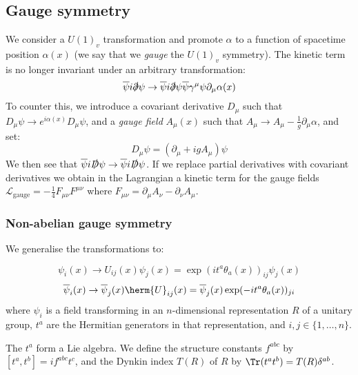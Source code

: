 \documentclass{jknotes}
\begin{document}
\subsection{Gauge symmetry}
We consider a \(U(1)_v\) transformation and promote \(\alpha\) to a function of spacetime position \(\alpha(x)\) (we say that we \emph{gauge} the \(U(1)_v\) symmetry). The kinetic term is no longer invariant under an arbitrary transformation:
\begin{equation}
    \overline{\psi}i\slashed{\partial}\psi \rightarrow \overline{\psi}i\slashed{\partial}\psi \overline{\psi}\gamma^\mu\psi\partial_\mu\alpha(x)
\end{equation}
To counter this, we introduce a covariant derivative \(D_\mu\) such that \(D_\mu\psi\rightarrow e^{i\alpha(x)}D_\mu\psi\), and a \emph{gauge field} \(A_\mu(x)\) such that \(A_\mu \rightarrow A_\mu - \frac{1}{g}\partial_\mu\alpha\), and set:
\begin{equation}
    D_\mu\psi = (\partial_\mu + igA_\mu)\psi
\end{equation}
We then see that \(\overline{\psi}i\slashed{D}\psi \rightarrow \overline{\psi}i\slashed{D}\psi\). If we replace partial derivatives with covariant derivatives we obtain in the Lagrangian a kinetic term for the gauge fields \(\mathcal{L}_{\text{gauge}} = - \frac{1}{4}F_{\mu\nu}F^{\mu\nu}\) where \(F_{\mu\nu} = \partial_\mu A_\nu - \partial_\nu A_\mu\).

\subsubsection{Non-abelian gauge symmetry}

We generalise the transformations to:

\begin{equation}
    \psi_i(x) \rightarrow U_{ij}(x)\psi_j(x) = \exp(it^a\theta_a(x))_{ij}\psi_j(x)
\end{equation}
\begin{equation}
    \overline{\psi}_i(x) \rightarrow \overline{\psi}_j(x) \herm{U}_{ij}(x) = \overline{\psi}_j(x)\exp(-it^a\theta_a(x))_{ji}
\end{equation}
where \(\psi_i\) is a field transforming in an \(n\)-dimensional representation \(R\) of a unitary group, \(t^a\) are the Hermitian generators in that representation, and \(i,j\in\{1,\dots,n\}\).

The \(t^a\) form a Lie algebra. We define the structure constants \(f^{abc}\) by \([t^a,t^b] = i f^{abc}t^c\), and the Dynkin index \(T(R)\) of \(R\) by \(\Tr(t^at^b)=T(R)\delta^{ab}\).
\end{document}
